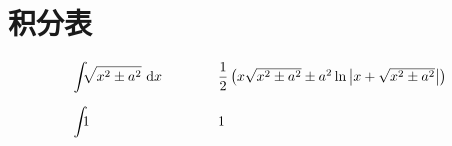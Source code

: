 \chapter*{积分表}

$$
\setlength{\arraycolsep}{20pt}
\begin{array}{ll}
	\mint\sqrt{x^2\pm a^2}\td x & \dfrac 1 2 \left(x\sqrt{x^2\pm a^2}\pm a^2\ln\left|x+\sqrt{x^2\pm a^2}\right|\right)  \\[15
	pt]
	\mint1 & 1
\end{array}
$$